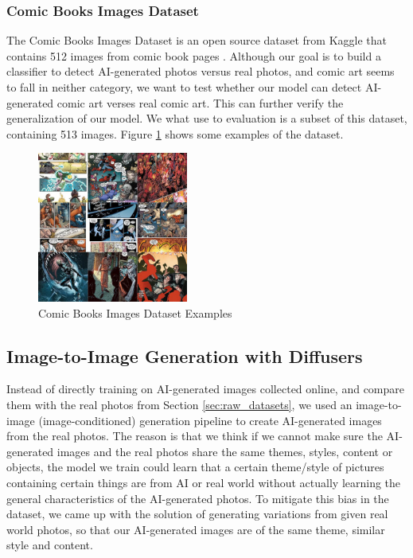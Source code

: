 \documentclass[11pt]{article}
\begin{document}
\subsubsection{Comic Books Images Dataset}

The Comic Books Images Dataset is an open source dataset from Kaggle that contains 512 images from comic book pages \cite{cenkbircanoglu2017comicbooksimages}. Although our goal is to build a classifier to detect AI-generated photos versus real photos, and comic art seems to fall in neither category, we want to test whether our model can detect AI-generated comic art verses real comic art. This can further verify the generalization of our model. We what use to evaluation is a subset of this dataset, containing 513 images. Figure \ref{fig:paper_comic_dataset} shows some examples of the dataset.

\begin{figure}[h]
  \centering
  \includegraphics[width=140pt]{./assets/paper_comic_dataset.jpg}
  \caption{Comic Books Images Dataset Examples}
  \label{fig:paper_comic_dataset}
\end{figure}

\subsection{Image-to-Image Generation with Diffusers}

Instead of directly training on AI-generated images collected online, and compare them with the real photos from Section \ref{sec:raw_datasets}, we used an image-to-image (image-conditioned) generation pipeline to create AI-generated images from the real photos. The reason is that we think if we cannot make sure the AI-generated images and the real photos share the same themes, styles, content or objects, the model we train could learn that a certain theme/style of pictures containing certain things are from AI or real world without actually learning the general characteristics of the AI-generated photos. To mitigate this bias in the dataset, we came up with the solution of generating variations from given real world photos, so that our AI-generated images are of the same theme, similar style and content.
\end{document}
